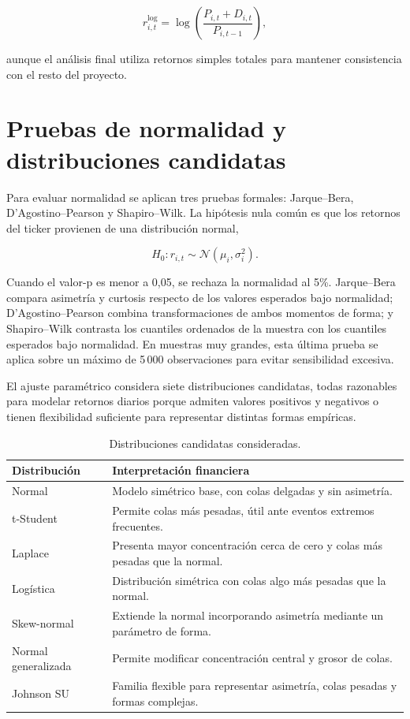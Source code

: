 \begin{equation}
r^{\log}_{i,t} =
\log\left(\frac{P_{i,t} + D_{i,t}}{P_{i,t-1}}\right),
\end{equation}

aunque el an\'alisis final utiliza retornos simples totales para mantener consistencia con el resto del proyecto.

\section*{Pruebas de normalidad y distribuciones candidatas}

Para evaluar normalidad se aplican tres pruebas formales: Jarque--Bera, D'Agostino--Pearson y Shapiro--Wilk. La hip\'otesis nula com\'un es que los retornos del ticker provienen de una distribuci\'on normal,

\begin{equation}
H_0: r_{i,t} \sim \mathcal{N}(\mu_i,\sigma_i^2).
\end{equation}

Cuando el valor-p es menor a 0,05, se rechaza la normalidad al 5\%. Jarque--Bera compara asimetr\'ia y curtosis respecto de los valores esperados bajo normalidad; D'Agostino--Pearson combina transformaciones de ambos momentos de forma; y Shapiro--Wilk contrasta los cuantiles ordenados de la muestra con los cuantiles esperados bajo normalidad. En muestras muy grandes, esta \'ultima prueba se aplica sobre un m\'aximo de 5\,000 observaciones para evitar sensibilidad excesiva.

El ajuste param\'etrico considera siete distribuciones candidatas, todas razonables para modelar retornos diarios porque admiten valores positivos y negativos o tienen flexibilidad suficiente para representar distintas formas emp\'iricas.

\begin{table}[h]
\centering
\caption{Distribuciones candidatas consideradas.}
\label{tab:anexo4_distribuciones}
\small
\begin{tabular}{@{}p{}p{}@{}}
\toprule
Distribuci\'on & Interpretaci\'on financiera \\
\midrule
Normal & Modelo sim\'etrico base, con colas delgadas y sin asimetr\'ia. \\
t-Student & Permite colas m\'as pesadas, \'util ante eventos extremos frecuentes. \\
Laplace & Presenta mayor concentraci\'on cerca de cero y colas m\'as pesadas que la normal. \\
Log\'istica & Distribuci\'on sim\'etrica con colas algo m\'as pesadas que la normal. \\
Skew-normal & Extiende la normal incorporando asimetr\'ia mediante un par\'ametro de forma. \\
Normal generalizada & Permite modificar concentraci\'on central y grosor de colas. \\
Johnson SU & Familia flexible para representar asimetr\'ia, colas pesadas y formas complejas. \\
\bottomrule
\end{tabular}
\end{table}

